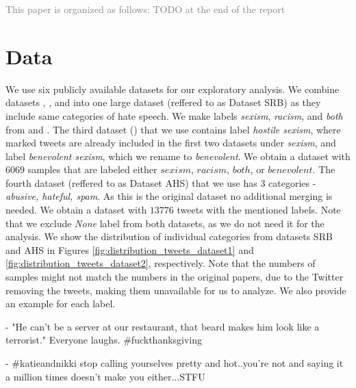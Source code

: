 \documentclass[fleqn,moreauthors,10pt]{ds_report}
\newcommand\bm{0.2pt}
\begin{document}
\textcolor{gray}{This paper is organized as follows: TODO at the end of the report}


\section*{Data}

We use six publicly available datasets for our exploratory analysis. We combine datasets \cite{waseem2016you}, \cite{rizoiu2019transfer}, and \cite{jha2017does} into one large dataset (reffered to as Dataset SRB) as they include same categories of hate speech. We make labels \textit{sexism}, \textit{racism}, and \textit{both} from \cite{waseem2016you} and \cite{rizoiu2019transfer}. The third dataset (\cite{jha2017does}) that we use contains label \textit{hostile sexism}, where marked tweets are already included in the first two datasets under \textit{sexism}, and label \textit{benevolent sexism}, which we rename to \textit{benevolent}. We obtain a dataset with $6069$ samples that are labeled either $sexism$, $racism$, $both$, or $benevolent$.
The fourth dataset (reffered to as Dataset AHS)\cite{founta2018large} that we use has $3$ categories - \textit{abusive,
hateful, spam}. As this is the original dataset no additional merging is needed. We obtain a dataset with $13776$ tweets with the mentioned labels. Note that we exclude \textit{None} label from both datasets, as we do not need it for the analysis.
We show the distribution of individual categories from datasets SRB and AHS in Figures \ref{fig:distribution_tweets_dataset1} and \ref{fig:distribution_tweets_dataset2}, respectively. Note that the numbers of samples might not match the numbers in the original papers, due to the Twitter removing the tweets, making them unavailable for us to analyze. We also provide an example for each label.

\begin{tcolorbox}[colback=black!8,width=0.9\linewidth, center,arc=8pt,sharp corners=downhill, boxrule=0.3pt, left=\bm, top=\bm, right=\bm, bottom=\bm, fontupper=\small]
 - "He can't be a server at our restaurant, that beard makes him look like a terrorist." Everyone laughs. \#fuckthanksgiving
\end{tcolorbox}

\begin{tcolorbox}[colback=black!8, width=0.9\linewidth, center,arc=8pt,sharp corners=downhill, boxrule=0.3pt, left=\bm, top=\bm, right=\bm, bottom=\bm, fontupper=\small]
 - \#katieandnikki stop calling yourselves pretty and hot..you're not and saying it a million times doesn't make you either...STFU
\end{tcolorbox}
\end{document}
